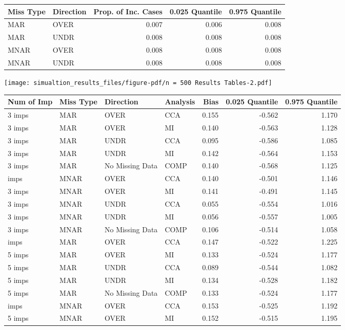 \documentclass[
  letterpaper,
  DIV=11,
  numbers=noendperiod]{scrartcl}
\begin{document}
\begin{tabular}[t]{llrrr}
\toprule
Miss Type & Direction & Prop. of Inc. Cases & 0.025 Quantile & 0.975 Quantile\\
\midrule
MAR & OVER & 0.007 & 0.006 & 0.008\\
MAR & UNDR & 0.008 & 0.008 & 0.008\\
MNAR & OVER & 0.008 & 0.008 & 0.008\\
MNAR & UNDR & 0.008 & 0.008 & 0.008\\
\bottomrule
\end{tabular}

\texttt{[image: simualtion\_results\_files/figure-pdf/n = 500 Results Tables-2.pdf]}

\begin{tabular}[t]{llllrrr}
\toprule
Num of Imp & Miss Type & Direction & Analysis & Bias & 0.025 Quantile & 0.975 Quantile\\
\midrule
3 imps & MAR & OVER & CCA & 0.155 & -0.562 & 1.170\\
3 imps & MAR & OVER & MI & 0.140 & -0.563 & 1.128\\
3 imps & MAR & UNDR & CCA & 0.095 & -0.586 & 1.085\\
3 imps & MAR & UNDR & MI & 0.142 & -0.564 & 1.153\\
3 imps & MAR & No Missing Data & COMP & 0.140 & -0.568 & 1.125\\
\addlinespace
3 imps & MNAR & OVER & CCA & 0.140 & -0.501 & 1.146\\
3 imps & MNAR & OVER & MI & 0.141 & -0.491 & 1.145\\
3 imps & MNAR & UNDR & CCA & 0.055 & -0.554 & 1.016\\
3 imps & MNAR & UNDR & MI & 0.056 & -0.557 & 1.005\\
3 imps & MNAR & No Missing Data & COMP & 0.106 & -0.514 & 1.058\\
\addlinespace
5 imps & MAR & OVER & CCA & 0.147 & -0.522 & 1.225\\
5 imps & MAR & OVER & MI & 0.133 & -0.524 & 1.177\\
5 imps & MAR & UNDR & CCA & 0.089 & -0.544 & 1.082\\
5 imps & MAR & UNDR & MI & 0.134 & -0.528 & 1.182\\
5 imps & MAR & No Missing Data & COMP & 0.133 & -0.524 & 1.177\\
\addlinespace
5 imps & MNAR & OVER & CCA & 0.153 & -0.525 & 1.192\\
5 imps & MNAR & OVER & MI & 0.152 & -0.515 & 1.195\\

\end{tabular}
\end{document}
